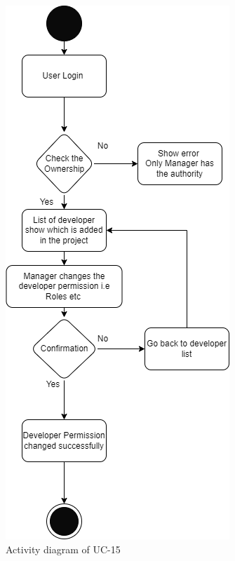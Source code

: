 \begin{figure}[H]
    \centering
    \includegraphics[scale=0.7]{./diagrams/Activity Diagram/ad-15.png}
    \caption{Activity diagram of UC-15}
    \label{fig:act-15}

\end{figure}


